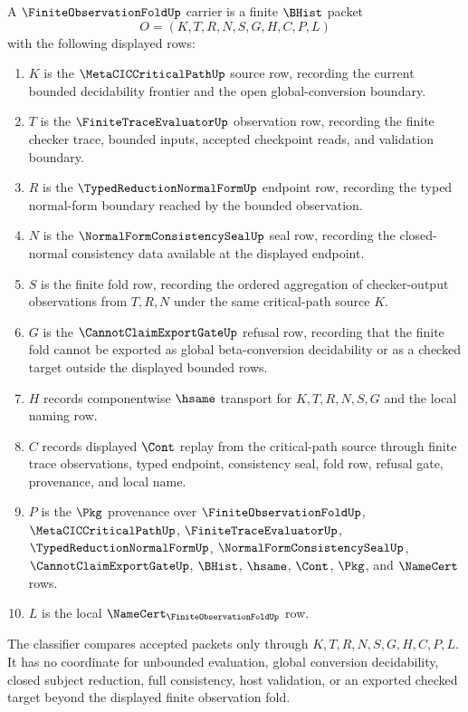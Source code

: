 \begin{definition}
\label{def:finite-observation-fold-carrier}
A $\FiniteObservationFoldUp$ carrier is a finite $\BHist$ packet
$$
O=(K,T,R,N,S,G,H,C,P,L)
$$
with the following displayed rows:
\begin{enumerate}
\item $K$ is the $\MetaCICCriticalPathUp$ source row, recording the current bounded decidability frontier and the open global-conversion boundary.
\item $T$ is the $\FiniteTraceEvaluatorUp$ observation row, recording the finite checker trace, bounded inputs, accepted checkpoint reads, and validation boundary.
\item $R$ is the $\TypedReductionNormalFormUp$ endpoint row, recording the typed normal-form boundary reached by the bounded observation.
\item $N$ is the $\NormalFormConsistencySealUp$ seal row, recording the closed-normal consistency data available at the displayed endpoint.
\item $S$ is the finite fold row, recording the ordered aggregation of checker-output observations from $T,R,N$ under the same critical-path source $K$.
\item $G$ is the $\CannotClaimExportGateUp$ refusal row, recording that the finite fold cannot be exported as global beta-conversion decidability or as a checked target outside the displayed bounded rows.
\item $H$ records componentwise $\hsame$ transport for $K,T,R,N,S,G$ and the local naming row.
\item $C$ records displayed $\Cont$ replay from the critical-path source through finite trace observations, typed endpoint, consistency seal, fold row, refusal gate, provenance, and local name.
\item $P$ is the $\Pkg$ provenance over $\FiniteObservationFoldUp$, $\MetaCICCriticalPathUp$, $\FiniteTraceEvaluatorUp$, $\TypedReductionNormalFormUp$, $\NormalFormConsistencySealUp$, $\CannotClaimExportGateUp$, $\BHist$, $\hsame$, $\Cont$, $\Pkg$, and $\NameCert$ rows.
\item $L$ is the local $\NameCert_{\FiniteObservationFoldUp}$ row.
\end{enumerate}
The classifier compares accepted packets only through $K,T,R,N,S,G,H,C,P,L$. It has no coordinate for unbounded evaluation, global conversion decidability, closed subject reduction, full consistency, host validation, or an exported checked target beyond the displayed finite observation fold.
\end{definition}

